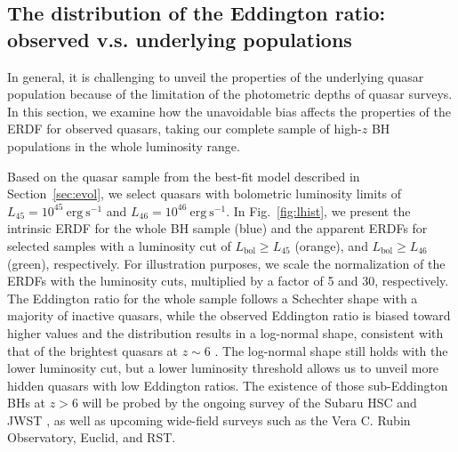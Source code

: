 \documentclass[twocolumn, twocolappendix]{aastex63}
\newcommand{\Lbol}{L_\mathrm{bol}}
\begin{document}
\begin{CJK*}{UTF8}{gbsn}
\vspace{2mm}
\subsection{The distribution of the Eddington ratio: \\observed v.s. underlying populations}\label{sec:ldist}

In general, it is challenging to unveil the properties of the underlying quasar population
because of the limitation of the photometric depths of quasar surveys.
In this section, we examine how the unavoidable bias affects the properties of the ERDF for observed quasars,
taking our complete sample of high-$z$ BH populations in the whole luminosity range.

Based on the quasar sample from the best-fit model described in Section~\ref{sec:evol},
we select quasars with bolometric luminosity limits of $L_{45}=10^{45}~\mathrm{erg~s^{-1}}$ and $L_{46}=10^{46}~\mathrm{erg~s^{-1}}$.
In Fig.~\ref{fig:lhist}, we present the intrinsic ERDF for the whole BH sample (blue)
and the apparent ERDFs for selected samples with a luminosity cut of $\Lbol \geq L_{45}$ (orange),
and $\Lbol \geq L_{46}$ (green), respectively.
For illustration purposes, we scale the normalization of the ERDFs with the luminosity cuts, multiplied by a factor of 5 and 30, respectively.
The Eddington ratio for the whole sample follows a Schechter shape with a majority of inactive quasars,
while the observed Eddington ratio is biased toward higher values and the distribution results in a log-normal shape,
consistent with that of the brightest quasars at $z\sim 6$ \citep[e.g.,][]{2010AJ....140..546W,2019ApJ...873...35S,2021ApJ...923..262Y,2022arXiv220705113F}.
The log-normal shape still holds with the lower luminosity cut, but a lower luminosity threshold allows us to unveil more hidden quasars with low Eddington ratios.
The existence of those sub-Eddington BHs at $z>6$ will be probed by the ongoing survey of the Subaru HSC and JWST
\citep{2019ApJ...880...77O,2021jwst.prop.1967O}, as well as upcoming wide-field surveys such as the Vera C. Rubin Observatory, Euclid, and RST.



\end{CJK*}
\end{document}
